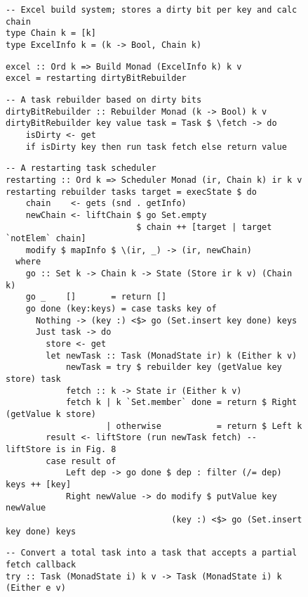 \begin{figure}
\begin{verbatim}
-- Excel build system; stores a dirty bit per key and calc chain
type Chain k = [k]
type ExcelInfo k = (k -> Bool, Chain k)
\end{verbatim}
\vspace{1mm}
\begin{verbatim}
excel :: Ord k => Build Monad (ExcelInfo k) k v
excel = restarting dirtyBitRebuilder
\end{verbatim}
\vspace{1mm}
\begin{verbatim}
-- A task rebuilder based on dirty bits
dirtyBitRebuilder :: Rebuilder Monad (k -> Bool) k v
dirtyBitRebuilder key value task = Task $ \fetch -> do
    isDirty <- get
    if isDirty key then run task fetch else return value
\end{verbatim}
\vspace{1mm}
\begin{verbatim}
-- A restarting task scheduler
restarting :: Ord k => Scheduler Monad (ir, Chain k) ir k v
restarting rebuilder tasks target = execState $ do
    chain    <- gets (snd . getInfo)
    newChain <- liftChain $ go Set.empty
                          $ chain ++ [target | target `notElem` chain]
    modify $ mapInfo $ \(ir, _) -> (ir, newChain)
  where
    go :: Set k -> Chain k -> State (Store ir k v) (Chain k)
    go _    []       = return []
    go done (key:keys) = case tasks key of
      Nothing -> (key :) <$> go (Set.insert key done) keys
      Just task -> do
        store <- get
        let newTask :: Task (MonadState ir) k (Either k v)
            newTask = try $ rebuilder key (getValue key store) task
            fetch :: k -> State ir (Either k v)
            fetch k | k `Set.member` done = return $ Right (getValue k store)
                    | otherwise           = return $ Left k
        result <- liftStore (run newTask fetch) -- liftStore is in Fig. 8
        case result of
            Left dep -> go done $ dep : filter (/= dep) keys ++ [key]
            Right newValue -> do modify $ putValue key newValue
                                 (key :) <$> go (Set.insert key done) keys
\end{verbatim}
\vspace{1mm}
\begin{verbatim}
-- Convert a total task into a task that accepts a partial fetch callback
try :: Task (MonadState i) k v -> Task (MonadState i) k (Either e v)

\end{verbatim}
\end{figure}
